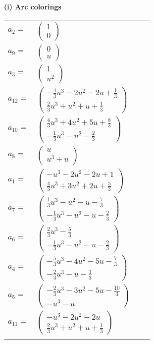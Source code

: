\documentclass[1p]{elsarticle_modified}
\theoremstyle{definition}
\begin{document}
\flushleft \textbf{(i) Arc colorings}\\
\begin{tabular}{m{7pt} m{180pt} m{7pt} m{180pt} }
\flushright $a_{2}=$&$\begin{pmatrix}1\\0\end{pmatrix}$ \\
\flushright $a_{9}=$&$\begin{pmatrix}0\\u\end{pmatrix}$ \\
\flushright $a_{3}=$&$\begin{pmatrix}1\\u^2\end{pmatrix}$ \\
\flushright $a_{12}=$&$\begin{pmatrix}-\frac{4}{3} u^3-2 u^2-2 u+\frac{1}{3}\\\frac{2}{3} u^3+u^2+u+\frac{1}{3}\end{pmatrix}$ \\
\flushright $a_{10}=$&$\begin{pmatrix}\frac{4}{3} u^3+4 u^2+5 u+\frac{8}{3}\\-\frac{1}{3} u^3- u^2-\frac{2}{3}\end{pmatrix}$ \\
\flushright $a_{8}=$&$\begin{pmatrix}u\\u^3+u\end{pmatrix}$ \\
\flushright $a_{1}=$&$\begin{pmatrix}- u^3-2 u^2-2 u+1\\\frac{4}{3} u^3+3 u^2+2 u+\frac{5}{3}\end{pmatrix}$ \\
\flushright $a_{7}=$&$\begin{pmatrix}\frac{1}{3} u^3- u^2- u-\frac{7}{3}\\-\frac{1}{3} u^3- u^2- u-\frac{2}{3}\end{pmatrix}$ \\
\flushright $a_{6}=$&$\begin{pmatrix}\frac{2}{3} u^3-\frac{5}{3}\\-\frac{1}{3} u^3- u^2- u-\frac{2}{3}\end{pmatrix}$ \\
\flushright $a_{4}=$&$\begin{pmatrix}-\frac{5}{3} u^3-4 u^2-5 u-\frac{7}{3}\\-\frac{2}{3} u^3- u-\frac{1}{3}\end{pmatrix}$ \\
\flushright $a_{5}=$&$\begin{pmatrix}-\frac{2}{3} u^3-3 u^2-5 u-\frac{10}{3}\\- u^3- u\end{pmatrix}$ \\
\flushright $a_{11}=$&$\begin{pmatrix}- u^3-2 u^2-2 u\\\frac{2}{3} u^3+u^2+u+\frac{1}{3}\end{pmatrix}$\\&\end{tabular}
\end{document}
